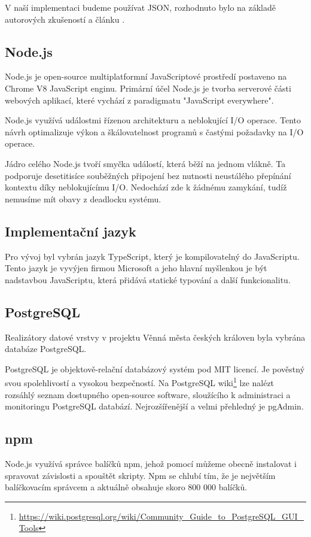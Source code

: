 \documentclass[thesis=B,czech]{FITthesis}[2012/06/26]
\begin{document}
        V naší implementaci budeme používat JSON, rozhodnuto bylo na základě autorových zkušeností a článku \cite{whyJSON}.
        \subsection{Node.js}
            Node.js je open-source multiplatformní JavaScriptové prostředí postaveno na Chrome V8 JavaScript enginu. Primární účel Node.js je tvorba serverové části webových aplikací, které vychází z paradigmatu "JavaScript everywhere".
            
            Node.js využívá událostmi řízenou architekturu a neblokující I/O operace. Tento návrh optimalizuje výkon a škálovatelnost programů s častými požadavky na I/O operace.
            
            Jádro celého Node.js tvoří smyčka událostí, která běží na jednom vlákně. Ta podporuje desetitisíce souběžných připojení bez nutnosti neustálého přepínání kontextu díky neblokujícímu I/O. Nedochází zde k žádnému zamykání, tudíž nemusíme mít obavy z deadlocku systému.
            \cite{node}
        \subsection{Implementační jazyk}
            Pro vývoj byl vybrán jazyk TypeScript, který je kompilovatelný do JavaScriptu. Tento jazyk je vyvýjen firmou Microsoft a jeho hlavní myšlenkou je být nadstavbou JavaScriptu, která přidává statické typování a další funkcionalitu.
        \subsection{PostgreSQL}
            Realizátory datové vrstvy v projektu Věnná města českých královen byla vybrána databáze PostgreSQL.
            
            PostgreSQL je objektově-relační databázový systém pod MIT licencí. Je pověstný svou spolehlivostí a vysokou bezpečností. Na PostgreSQL wiki\footnote{\url{https://wiki.postgresql.org/wiki/Community_Guide_to_PostgreSQL_GUI_Tools}} lze nalézt rozsáhlý seznam dostupného open-source software, sloužícího k administraci a monitoringu PostgreSQL databází. Nejrozšířenější a velmi přehledný je pgAdmin.
            \cite{postgres}
        \subsection{npm}
            Node.js využívá správce balíčků npm, jehož pomocí můžeme obecně instalovat i spravovat závislosti a spouštět skripty. Npm se chlubí tím, že je největším balíčkovacím správcem a aktuálně obsahuje skoro 800 000 balíčků.
            \cite{modulecounts}
\end{document}
